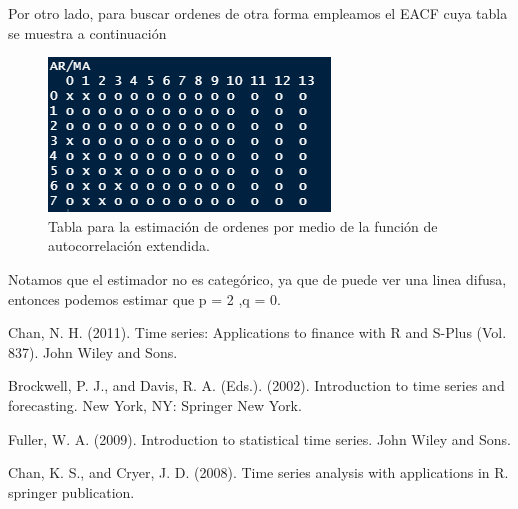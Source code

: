\documentclass[a4paper, 11pt]{article}
\begin{document}
Por otro lado, para buscar ordenes de otra forma empleamos el EACF cuya tabla se muestra a continuación
\begin{figure}[H] 
    \centering 
    \includegraphics[width = 10 cm ]{Figures/EACF8.png} 
    \caption{Tabla para la estimación de ordenes por medio de la función de autocorrelación extendida.}
    \label{Fig. 8.4}
\end{figure} 
Notamos que el estimador no es categórico, ya que de puede ver una linea difusa, entonces podemos estimar que p = 2 ,q = 0.

\begin{thebibliography}{9}

    Chan, N. H. (2011). Time series: Applications to finance with R and S-Plus (Vol. 837). John Wiley and Sons.
  
    Brockwell, P. J., and Davis, R. A. (Eds.). (2002). Introduction to time series and forecasting. New York, NY: Springer New York.

    Fuller, W. A. (2009). Introduction to statistical time series. John Wiley and Sons.

    Chan, K. S., and Cryer, J. D. (2008). Time series analysis with applications in R. springer publication.
\end{thebibliography}

    
\end{document}
